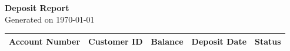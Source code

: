\documentclass[a4paper,12pt]{article}
\begin{document}
\begin{center}
    \vspace*{1cm}
    \textbf{\Large Deposit Report} \\
    \vspace{0.5cm}
    Generated on \today \\
    \vspace{1cm}
\end{center}

\begin{landscape}

\begin{longtable}{@{}p{2cm}p{2cm}p{2cm}p{2cm}p{2cm}@{}}
    \toprule
    \rowcolor{headerblue}
    \color{white}\textbf{Account Number} & \color{white}\textbf{Customer ID} & \color{white}\textbf{Balance} & \color{white}\textbf{Deposit Date} & \color{white}\textbf{Status} \\
    \midrule
    \endhead
    
    \bottomrule
\end{longtable}

\end{landscape}
\end{document}
